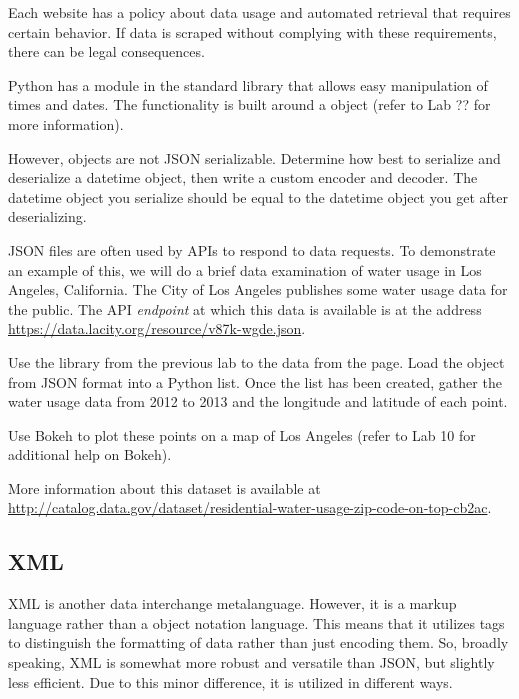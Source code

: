 \begin{warn}
Each website has a policy about data usage and automated retrieval that requires certain behavior.
If data is scraped without complying with these requirements, there can be legal consequences.
\end{warn}

\begin{problem} %
Python has a module in the standard library that allows easy manipulation of times and dates. The functionality is built around a  object (refer to Lab ?? for more information).

However,  objects are not JSON serializable.
Determine how best to serialize and deserialize a datetime object, then write a custom encoder and decoder.
The datetime object you serialize should be equal to the datetime object you get after deserializing.
\label{prob:datetime_json}
\end{problem}

\begin{problem}
JSON files are often used by APIs to respond to data requests.
To demonstrate an example of this, we will do a brief data examination of water usage in Los Angeles, California.
The City of Los Angeles publishes some water usage data for the public.
The API \emph{endpoint} at which this data is available is at the address \url{https://data.lacity.org/resource/v87k-wgde.json}.

Use the  library from the previous lab to  the data from the page. Load the object from JSON format into a Python list.
Once the list has been created, gather the water usage data from 2012 to 2013 and the longitude and latitude of each point.

Use Bokeh to plot these points on a map of Los Angeles (refer to Lab 10 for additional help on Bokeh).

More information about this dataset is available at \url{http://catalog.data.gov/dataset/residential-water-usage-zip-code-on-top-cb2ac}.
\end{problem}

\subsection*{XML} %

XML is another data interchange metalanguage.
However, it is a markup language rather than a object notation language. This means that it utilizes tags to distinguish the formatting of data rather than just encoding them.
So, broadly speaking, XML is somewhat more robust and versatile than JSON, but slightly less efficient.
Due to this minor difference, it is utilized in different ways.

